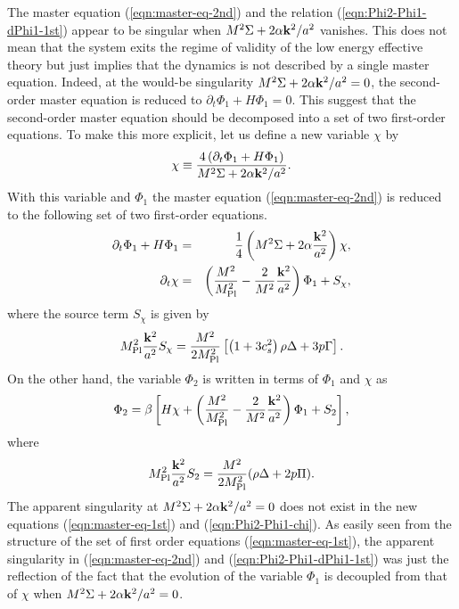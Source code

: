 The master equation (\ref{eqn:master-eq-2nd}) and the relation
(\ref{eqn:Phi2-Phi1-dPhi1-1st}) appear to be singular when
$M^2\Sigma+2\alpha{\bf k}^2/a^2$ vanishes. This does not mean that the
system exits the regime of validity of the low energy effective theory 
but just implies that the dynamics is not described by a single master
equation. Indeed, at the would-be singularity 
$M^2\Sigma+2\alpha{\bf k}^2/a^2=0$, the second-order master equation
is reduced to $\partial_t\Phi_1+H\Phi_1=0$. This suggest that the
second-order master equation should be decomposed into a set of two
first-order equations. To make this more explicit, let us define a new
variable $\chi$ by 
%
\begin{equation}
 \chi \equiv \frac{4\left(\partial_t\Phi_1+H\Phi_1\right)}
  {M^2\Sigma+2\alpha{\bf k}^2/a^2}.
\end{equation}
With this variable and $\Phi_1$ the master equation
(\ref{eqn:master-eq-2nd}) is reduced to the following set of two
first-order equations. 
%
\begin{eqnarray}
 \partial_t\Phi_1 + H\Phi_1 & = & \frac{1}{4}
  \left(M^2\Sigma+2\alpha\frac{{\bf k}^2}{a^2}\right)\chi, \nonumber\\
 \partial_t\chi & = & 
  \left(\frac{M^2}{M_{\rm Pl}^2}
   -\frac{2}{M^2}\frac{{\bf k}^2}{a^2}\right)\Phi_1
  + S_{\chi},
  \label{eqn:master-eq-1st}
\end{eqnarray}
where the source term $S_{\chi}$ is given by 
%
\begin{equation}
 M_{\rm Pl}^2\frac{{\bf k}^2}{a^2}S_{\chi} = 
  \frac{M^2}{2M_{\rm Pl}^2}
  \left[\left(1+3c_s^2\right)\rho\Delta+3p\Gamma\right].
\end{equation}
On the other hand, the variable $\Phi_2$ is written in terms of $\Phi_1$
and $\chi$ as
%
\begin{equation}
 \Phi_2 = \beta\left[ H\chi + 
  \left(\frac{M^2}{M_{\rm Pl}^2}-\frac{2}{M^2}
   \frac{{\bf k}^2}{a^2}\right)\Phi_1 + S_2\right],
 \label{eqn:Phi2-Phi1-chi}
\end{equation}
where
%
\begin{equation}
 M_{\rm Pl}^2\frac{{\bf k}^2}{a^2}S_2 = 
  \frac{M^2}{2M_{\rm Pl}^2}(\rho\Delta+2p\Pi).
\end{equation}
The apparent singularity at $M^2\Sigma+2\alpha{\bf k}^2/a^2=0$ does not
exist in the new equations (\ref{eqn:master-eq-1st}) and
(\ref{eqn:Phi2-Phi1-chi}). As easily seen from the structure of the set
of first order equations (\ref{eqn:master-eq-1st}), the apparent
singularity in (\ref{eqn:master-eq-2nd}) and
(\ref{eqn:Phi2-Phi1-dPhi1-1st}) was just the reflection of the fact that
the evolution of the variable $\Phi_1$ is decoupled from that of $\chi$
when $M^2\Sigma+2\alpha{\bf k}^2/a^2=0$. 





